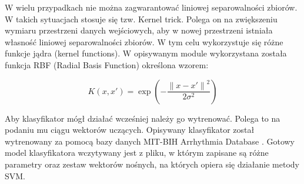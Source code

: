 \qquad W wielu przypadkach nie można zagwarantować liniowej separowalności zbiorów.  W takich sytuacjach stosuje się tzw. Kernel trick. Polega on na zwiększeniu wymiaru przestrzeni danych wejściowych, aby w nowej przestrzeni istniała własność liniowej separowalności zbiorów. W tym celu wykorzystuje się różne funkcje jądra (kernel functions). W opisywanym module wykorzystana została funkcja RBF (Radial Basis Function) określona wzorem:

\begin{equation}
\label{eq:RBF}
K(x,x') = \exp{\left(-\frac{{\|x-x'\|}^{2}}{2\sigma^2}\right)}
\end{equation}

\qquad Aby klasyfikator mógł działać wcześniej należy go wytrenować. Polega to na podaniu mu ciągu wektorów uczących. Opisywany klasyfikator został wytrenowany za pomocą bazy danych MIT-BIH Arrhythmia Database \cite{MITDB}. Gotowy model klasyfikatora wczytywany jest z pliku, w którym zapisane są różne parametry oraz zestaw wektorów nośnych, na których opiera się działanie metody SVM.

